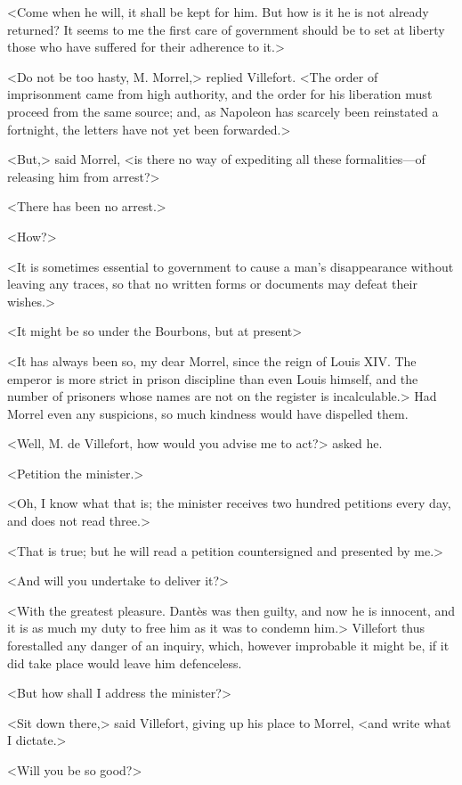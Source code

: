  <Come when he will, it shall be kept for him. But how is it he is not already returned? It seems to me the first care of government should be to set at liberty those who have suffered for their adherence to it.> 

 <Do not be too hasty, M. Morrel,> replied Villefort. <The order of imprisonment came from high authority, and the order for his liberation must proceed from the same source; and, as Napoleon has scarcely been reinstated a fortnight, the letters have not yet been forwarded.> 

 <But,> said Morrel, <is there no way of expediting all these formalities—of releasing him from arrest?> 

 <There has been no arrest.> 

 <How?> 

 <It is sometimes essential to government to cause a man's disappearance without leaving any traces, so that no written forms or documents may defeat their wishes.> 

 <It might be so under the Bourbons, but at present\longdash> 

 <It has always been so, my dear Morrel, since the reign of Louis XIV. The emperor is more strict in prison discipline than even Louis himself, and the number of prisoners whose names are not on the register is incalculable.> Had Morrel even any suspicions, so much kindness would have dispelled them. 

 <Well, M. de Villefort, how would you advise me to act?> asked he. 

 <Petition the minister.> 

 <Oh, I know what that is; the minister receives two hundred petitions every day, and does not read three.> 

 <That is true; but he will read a petition countersigned and presented by me.> 

 <And will you undertake to deliver it?> 

 <With the greatest pleasure. Dantès was then guilty, and now he is innocent, and it is as much my duty to free him as it was to condemn him.> Villefort thus forestalled any danger of an inquiry, which, however improbable it might be, if it did take place would leave him defenceless. 

 <But how shall I address the minister?> 

 <Sit down there,> said Villefort, giving up his place to Morrel, <and write what I dictate.> 

 <Will you be so good?> 

